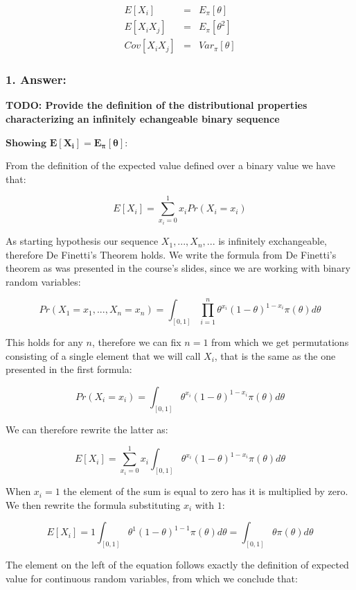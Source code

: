 \documentclass[
]{article}
\begin{document}
\begin{eqnarray*} 
E[X_i]&=&E_{\pi}[\theta]\\
E[X_i X_j] &=& E_{\pi}[\theta^2]\\
Cov[X_i X_j] &=& Var_{\pi}[\theta]
\end{eqnarray*}

\hypertarget{answer-5}{%
\subsubsection{1. Answer:}\label{answer-5}}

\textbf{TODO: Provide the definition of the distributional properties
characterizing an infinitely echangeable binary sequence}

\(\textbf{Showing } \mathbf{E[X_i]=E_{\pi}[\theta]}\):

From the definition of the expected value defined over a binary value we
have that:

\[
E[X_i] = \sum_{x_i=0}^1x_iPr(X_i=x_i)
\]

As starting hypothesis our sequence \(X_1,...,X_n,...\) is infinitely
exchangeable, therefore De Finetti's Theorem holds. We write the formula
from De Finetti's theorem as was presented in the course's slides, since
we are working with binary random variables:

\[
Pr(X_1=x_1,...,X_n=x_n) = 
\int_{[0,1]} \prod_{i=1}^n\theta^{x_i}(1 - \theta)^{1 - x_i} \pi(\theta)d\theta
\]

This holds for any \(n\), therefore we can fix \(n = 1\) from which we
get permutations consisting of a single element that we will call
\(X_i\), that is the same as the one presented in the first formula:

\[
Pr(X_i=x_i) = 
\int_{[0,1]} \theta^{x_i}(1 - \theta)^{1 - x_i} \pi(\theta)d\theta
\]

We can therefore rewrite the latter as:

\[
E[X_i] = 
\sum_{x_i=0}^1x_i\int_{[0,1]} \theta^{x_i}(1 - \theta)^{1 - x_i} \pi(\theta)d\theta
\]

When \(x_i = 1\) the element of the sum is equal to zero has it is
multiplied by zero. We then rewrite the formula substituting \(x_i\)
with \(1\):

\[
E[X_i] = 1\int_{[0,1]} \theta^{1}(1 - \theta)^{1 - 1} \pi(\theta)d\theta
= \int_{[0,1]} \theta \pi(\theta)d\theta
\]

The element on the left of the equation follows exactly the definition
of expected value for continuous random variables, from which we
conclude that:
\end{document}
